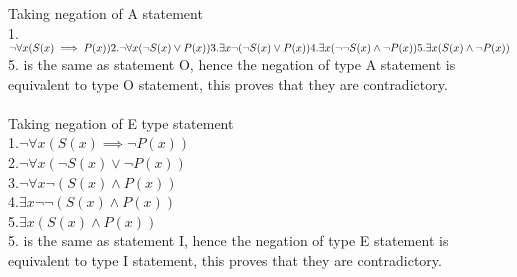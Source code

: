 \documentclass[a4paper]{exam}
\begin{document}
\begin{questions}
\begin{parts}
\begin{solution}
    Taking negation of A statement\\
    1. $\lnot \forall x(S(x) \implies P(x))\\
    2. \lnot \forall x (\lnot S(x) \lor P(x))\\
    3. \exists x \lnot (\lnot S(x) \lor P(x))\\
    4. \exists x  (\lnot\lnot S(x) \land \lnot P(x))\\
    5. \exists x  (S(x) \land \lnot P(x))\\
    $
    5. is the same as statement O, hence the negation of type A statement is equivalent to type O statement, this proves that they are contradictory.
    \\
    \\
    Taking negation of E type statement\\ 
    1.$ \lnot \forall x(S(x) \implies \neg P(x))$\\
    2.$ \lnot \forall x( \lnot S(x) \lor \neg P(x))$\\
    3.$ \lnot \forall x\lnot(  S(x) \land P(x))$\\
    4.$ \exists x \lnot \lnot (  S(x) \land P(x))$\\
    5.$ \exists x (  S(x) \land P(x))$\\
     5. is the same as statement I, hence the negation of type E statement is equivalent to type I statement, this proves that they are contradictory.

  \end{solution}
  \end{parts}
  
\end{questions}
\end{document}
